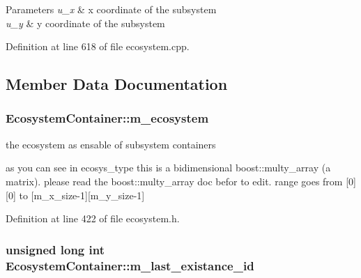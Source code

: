 \begin{DoxyParams}{Parameters}
{\em u\_\-x} & x coordinate of the subsystem \\
\hline
{\em u\_\-y} & y coordinate of the subsystem \\
\hline
\end{DoxyParams}


Definition at line 618 of file ecosystem.cpp.



\subsection{Member Data Documentation}
\hypertarget{classEcosystemContainer_a19f047377f131b497c7258b58adb1a45}{
\subsubsection[{m\_\-ecosystem}]{ {\bf EcosystemContainer::m\_\-ecosystem}}}
\label{classEcosystemContainer_a19f047377f131b497c7258b58adb1a45}


the ecosystem as ensable of subsystem containers 

as you can see in ecosys\_\-type this is a bidimensional boost::multy\_\-array (a matrix). please read the boost::multy\_\-array doc befor to edit. range goes from \mbox{[}0\mbox{]}\mbox{[}0\mbox{]} to \mbox{[}m\_\-x\_\-size-\/1\mbox{]}\mbox{[}m\_\-y\_\-size-\/1\mbox{]} 

Definition at line 422 of file ecosystem.h.

\hypertarget{classEcosystemContainer_adefb24e46962eab1528a2fc322ae6e53}{
\subsubsection[{m\_\-last\_\-existance\_\-id}]{\setlength{\rightskip}{0pt plus 5cm}unsigned long int {\bf EcosystemContainer::m\_\-last\_\-existance\_\-id}}}
\label{classEcosystemContainer_adefb24e46962eab1528a2fc322ae6e53}


